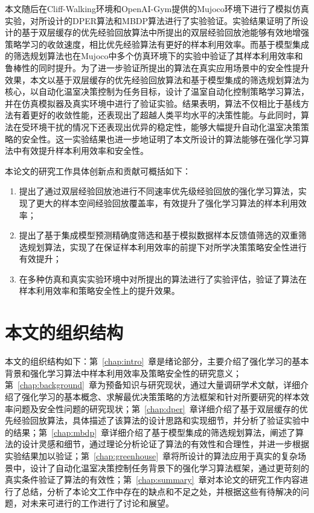 本文随后在Cliff-Walking环境和OpenAI-Gym提供的Mujoco环境下进行了模拟仿真实验，对所设计的DPER算法和MBDP算法进行了实验验证。实验结果证明了所设计的基于双层缓存的优先经验回放算法中所提出的双层经验回放池能够有效地增强策略学习的收敛速度，相比优先经验算法有更好的样本利用效率。而基于模型集成的筛选规划算法也在Mujoco中多个仿真环境下的实验中验证了其样本利用效率和鲁棒性的同时提升。为了进一步验证所提出的算法在真实应用场景中的安全性提升效果，本文以基于双层缓存的优先经验回放算法和基于模型集成的筛选规划算法为核心，以自动化温室决策控制为任务目标，设计了温室自动化控制策略学习算法，并在仿真模拟器及真实环境中进行了验证实验。结果表明，算法不仅相比于基线方法有着更好的收敛性能，还表现出了超越人类平均水平的决策性能。与此同时，算法在受环境干扰的情况下还表现出优异的稳定性，能够大幅提升自动化温室决策策略的安全性。这一实验结果也进一步地证明了本文所设计的算法能够在强化学习算法中有效提升样本利用效率和安全性。

本论文的研究工作具体创新点和贡献可概括如下：

\begin{enumerate}[1）]
    \item 提出了通过双层经验回放池进行不同速率优先级经验回放的强化学习算法，实现了更大的样本空间经验回放覆盖率，有效提升了强化学习算法的样本利用效率；
    \item 提出了基于集成模型预测精确度筛选和基于模拟数据样本反馈值筛选的双重筛选规划算法，实现了在保证样本利用效率的前提下对所学决策策略安全性进行有效提升；
    \item 在多种仿真和真实实验环境中对所提出的算法进行了实验评估，验证了算法在样本利用效率和策略安全性上的提升效果。
\end{enumerate}

\section{本文的组织结构}

本文的组织结构如下：第~\ref{chap:intro}~章是绪论部分，主要介绍了强化学习的基本背景和强化学习算法中样本利用效率及策略安全性的研究意义；第~\ref{chap:background}~章为预备知识与研究现状，通过大量调研学术文献，详细介绍了强化学习的基本概念、求解最优决策策略的方法框架和针对所要研究的样本效率问题及安全性问题的研究现状；第~\ref{chap:dper}~章详细介绍了基于双层缓存的优先经验回放算法，具体描述了该算法的设计思路和实现细节，并分析了验证实验中的结果；第~\ref{chap:mbdp}~章详细介绍了基于模型集成的筛选规划算法，阐述了算法的设计灵感和细节，通过理论分析论证了算法的有效性和合理性，并进一步根据实验结果加以验证；第~\ref{chap:greenhouse}~章将所设计的算法应用于真实的复杂场景中，设计了自动化温室决策控制任务背景下的强化学习算法框架，通过更苛刻的真实条件验证了算法的有效性；第~\ref{chap:summary}~章对本论文的研究工作内容进行了总结，分析了本论文工作中存在的缺点和不足之处，并根据这些有待解决的问题，对未来可进行的工作进行了讨论和展望。